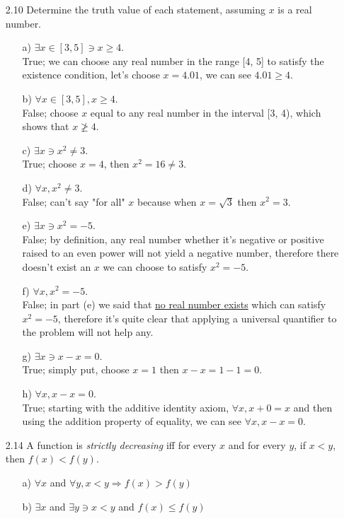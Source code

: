 \documentclass[12pt]{article}
\begin{document}
\begin{enumerate}
\item[2.10] Determine the truth value of each statement, assuming $x$ is a real number.
\begin{enumerate}
\item[a)] $\exists x \in [3, 5] \ni x \geq 4$.\\
True; we can choose any real number in the range [4, 5] to satisfy the existence condition, let's
choose $x = 4.01$, we can see $4.01 \geq 4$.
\item[b)] $\forall x \in [3, 5], x \geq 4$.\\
False; choose $x$ equal to any real number in the interval [3, 4), which shows that
$x \not\geq 4$.
\item[c)] $\exists x \ni x^2 \neq 3$.\\
True; choose $x = 4$, then $x^2 = 16 \neq 3$.
\item[d)] $\forall x, x^2 \neq 3$.\\
False; can't say "for all" $x$ because when $x = \sqrt{3}$ then $x^2 = 3$.
\item[e)] $\exists x \ni x^2 = -5$.\\
False; by definition, any real number whether it's negative or positive raised to an even power will not yield a negative number, therefore there doesn't exist an $x$ we can choose to satisfy $x^2 = -5$.
\item[f)] $\forall x, x^2 = -5$.\\
False; in part (e) we said that \underline{no real number exists} which can 
satisfy $x^2 = -5$, therefore it's quite clear that applying a universal quantifier to 
the problem will not help any.
\item[g)] $\exists x \ni x - x = 0$.\\
True; simply put, choose $x = 1$ then $x - x = 1 - 1 = 0$.
\item[h)] $\forall x, x - x = 0$.\\
True; starting with the additive identity axiom, $\forall x, x + 0 = x$ and then
using the addition property of equality, we can see $\forall x, x - x = 0$.
\end{enumerate}

\item[2.14] A function is \emph{strictly decreasing} iff for every $x$ and for every $y$, if $x < y$, then $f(x) < f(y)$.
\begin{enumerate}
\item[a)] $\forall x$ and $\forall y, x < y \Rightarrow f(x) > f(y)$
\item[b)] $\exists x$ and $\exists y \ni x < y$ and $f(x) \leq f(y)$
\end{enumerate}


\end{enumerate}
\end{document}
